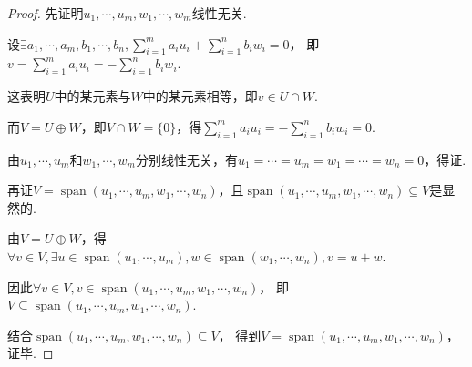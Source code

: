 \begin{proof}
    先证明\(u_1,\cdots,u_m,w_1,\cdots,w_m\)线性无关.

    设\(\exists a_1,\cdots,a_m,b_1,\cdots,b_n,\sum_{i=1}^m a_iu_i+\sum_{i=1}^n b_iw_i=0\)，
    即\(v=\sum_{i=1}^m a_iu_i=-\sum_{i=1}^n b_iw_i\).
    
    这表明\(U\)中的某元素与\(W\)中的某元素相等，即\(v\in U\cap W\).
    
    而\(V=U\oplus W\)，即\(V\cap W=\{0\}\)，得\(\sum_{i=1}^m a_iu_i=-\sum_{i=1}^n b_iw_i=0\).
    
    由\(u_1,\cdots,u_m\)和\(w_1,\cdots,w_m\)分别线性无关，有\(u_1=\cdots=u_m=w_1=\cdots=w_n=0\)，得证.
    
    再证\(V=\operatorname{span}(u_1,\cdots,u_m,w_1,\cdots,w_n)\)，且\(\operatorname{span}(u_1,\cdots,u_m,w_1,\cdots,w_n) \subseteq V\)是显然的.
    
    由\(V=U\oplus W\)，得\(\forall v\in V,\exists u \in \operatorname{span}(u_1,\cdots,u_m),w \in \operatorname{span}(w_1,\cdots,w_n),v=u+w\).
    
    因此\(\forall v \in V,v \in \operatorname{span} (u_1,\cdots,u_m,w_1,\cdots,w_n)\)，
    即\(V \subseteq \operatorname{span}(u_1,\cdots,u_m,w_1,\cdots,w_n)\).
    
    结合\(\operatorname{span}(u_1,\cdots,u_m,w_1,\cdots,w_n) \subseteq V\)，
    得到\(V=\operatorname{span} (u_1,\cdots,u_m,w_1,\cdots,w_n)\)，证毕.
\end{proof}

